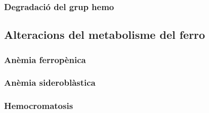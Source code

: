\subsubsection*{Degradació del grup hemo}


\subsection{Alteracions del metabolisme del ferro}

\subsubsection{Anèmia ferropènica}


\subsubsection{Anèmia sideroblàstica}


\subsubsection{Hemocromatosis}